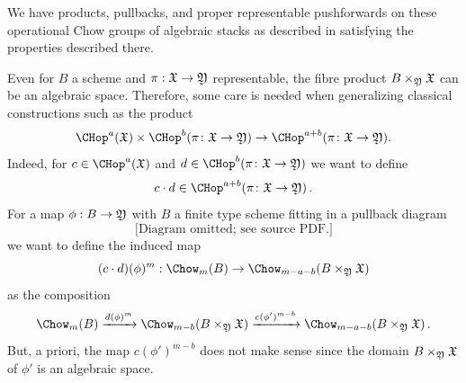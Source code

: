 We have products, pullbacks, and proper representable pushforwards on these operational Chow groups of algebraic stacks as described in \cite[chapter 17.2]{Fulton1984Intersection-th} satisfying the properties described there.



\begin{remark}
\notready\label{remark:opclassactonalgspaces}
Even for $B$ a scheme and $\pi: \frak X \to \frak Y$ representable, the fibre product $B \times_{\frak Y}\frak X$ can be an algebraic space. Therefore, some care is needed when generalizing classical constructions such as the product
\[\CHop^{a}(\frak X) \times \CHop^{b}(\pi\colon \frak X \to \frak Y) \to \CHop^{a+b}(\pi\colon \frak X \to \frak Y).\]
Indeed, for $c \in \CHop^{a}(\frak X)$ and  $d \in \CHop^{b}(\pi\colon \frak X \to \frak Y)$  we want to define $$c \cdot d \in \CHop^{a+b}(\pi\colon \frak X \to \frak Y)\, .$$
For a map $\phi: B \to \frak Y$ with $B$ a finite type scheme fitting in a pullback diagram
\[
\text{[Diagram omitted; see source PDF.]}
\]
we want to define the induced map
\[(c \cdot d)(\phi)^m : \Chow_m(B) \to \Chow_{m-a-b}(B \times_{\frak Y} \frak X)\]
as the composition
\[\Chow_m(B) \xrightarrow{d(\phi)^m} \Chow_{m-b}(B \times_{\frak Y} \frak X) \xrightarrow{c(\phi')^{m-b}} \Chow_{m-a-b}(B \times_{\frak Y} \frak X)\, .\]
But, a priori, the map $c(\phi')^{m-b}$ does not make sense since the domain $B \times_{\frak Y} \frak X$ of $\phi'$ is an algebraic space.

\end{remark}
